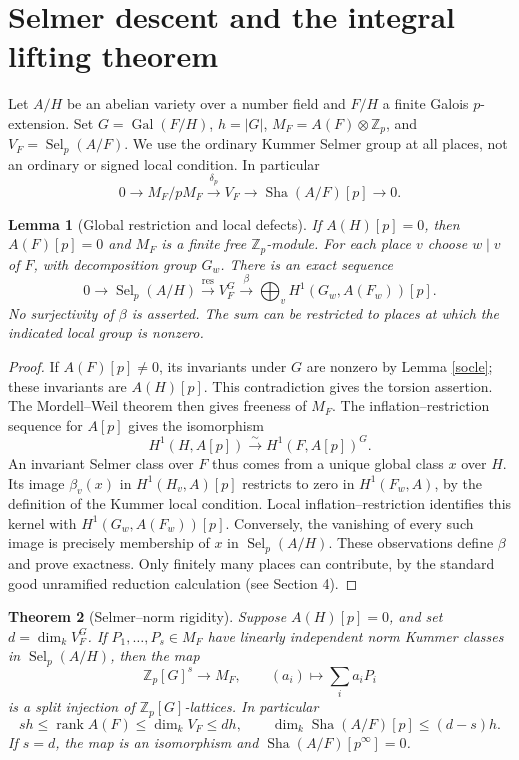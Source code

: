 \documentclass[11pt,a4paper]{article}
\newtheorem{theorem}{Theorem}[section]\newtheorem{proposition}[theorem]{Proposition}\newtheorem{lemma}[theorem]{Lemma}\newtheorem{corollary}[theorem]{Corollary}\theoremstyle{definition}\newtheorem{definition}[theorem]{Definition}\theoremstyle{remark}\newtheorem{remark}[theorem]{Remark}
\newcommand{\Zp}{\mathbb Z_p}\newcommand{\Qp}{\mathbb Q_p}\newcommand{\Fp}{\mathbb F_p}\newcommand{\Q}{\mathbb Q}\newcommand{\Sha}{\operatorname{Sha}}\newcommand{\Sel}{\operatorname{Sel}}\newcommand{\Gal}{\operatorname{Gal}}\newcommand{\Tr}{\operatorname{Tr}}\newcommand{\rk}{\operatorname{rank}}\newcommand{\ord}{\operatorname{ord}}\newcommand{\Hom}{\operatorname{Hom}}\newcommand{\SL}{\operatorname{SL}}\newcommand{\GL}{\operatorname{GL}}\newcommand{\coker}{\operatorname{coker}}\newcommand{\length}{\operatorname{length}}\newcommand{\res}{\operatorname{res}}\newcommand{\cor}{\operatorname{cor}}\newcommand{\Id}{\operatorname{id}}
\numberwithin{equation}{section}
\begin{document}
\section{Selmer descent and the integral lifting theorem}\label{selmer}
Let $A/H$ be an abelian variety over a number field and $F/H$ a finite Galois $p$-extension. Set $G=\Gal(F/H)$, $h=|G|$, $M_F=A(F)\otimes\Zp$, and $V_F=\Sel_p(A/F)$. We use the ordinary Kummer Selmer group at all places, not an ordinary or signed local condition. In particular
\begin{equation}\label{kummer}
0\longrightarrow M_F/pM_F\xrightarrow{\delta_p} V_F\longrightarrow\Sha(A/F)[p]\longrightarrow0.
\end{equation}
\begin{lemma}[Global restriction and local defects]\label{descent}
If $A(H)[p]=0$, then $A(F)[p]=0$ and $M_F$ is a finite free $\Zp$-module. For each place $v$ choose $w\mid v$ of $F$, with decomposition group $G_w$. There is an exact sequence
\begin{equation}\label{defseq}
0\to\Sel_p(A/H)\xrightarrow{\res} V_F^G
\xrightarrow{\beta} \bigoplus_v H^1(G_w,A(F_w))[p].
\end{equation}
No surjectivity of $\beta$ is asserted. The sum can be restricted to places at which the indicated local group is nonzero.
\end{lemma}
\begin{proof}
If $A(F)[p]\ne0$, its invariants under $G$ are nonzero by Lemma \ref{socle}; these invariants are $A(H)[p]$. This contradiction gives the torsion assertion. The Mordell--Weil theorem then gives freeness of $M_F$. The inflation--restriction sequence for $A[p]$ gives the isomorphism
\[ H^1(H,A[p])\xrightarrow{\sim} H^1(F,A[p])^G. \]
An invariant Selmer class over $F$ thus comes from a unique global class $x$ over $H$. Its image $\beta_v(x)$ in $H^1(H_v,A)[p]$ restricts to zero in $H^1(F_w,A)$, by the definition of the Kummer local condition. Local inflation--restriction identifies this kernel with $H^1(G_w,A(F_w))[p]$. Conversely, the vanishing of every such image is precisely membership of $x$ in $\Sel_p(A/H)$. These observations define $\beta$ and prove exactness. Only finitely many places can contribute, by the standard good unramified reduction calculation (see Section 4).
\end{proof}
\begin{theorem}[Selmer--norm rigidity]\label{rigidity}
Suppose $A(H)[p]=0$, and set $d=\dim_k V_F^G$. If $P_1,\ldots,P_s\in M_F$ have linearly independent norm Kummer classes in $\Sel_p(A/H)$, then the map
\[ \Zp[G]^s\longrightarrow M_F,\qquad (a_i)\longmapsto\sum_i a_iP_i \]
is a split injection of $\Zp[G]$-lattices. In particular
\begin{equation}\label{bounds}
sh\le\rk A(F)\le\dim_k V_F\le dh,\qquad
\dim_k\Sha(A/F)[p]\le(d-s)h.
\end{equation}
If $s=d$, the map is an isomorphism and $\Sha(A/F)[p^\infty]=0$.
\end{theorem}
\end{document}
